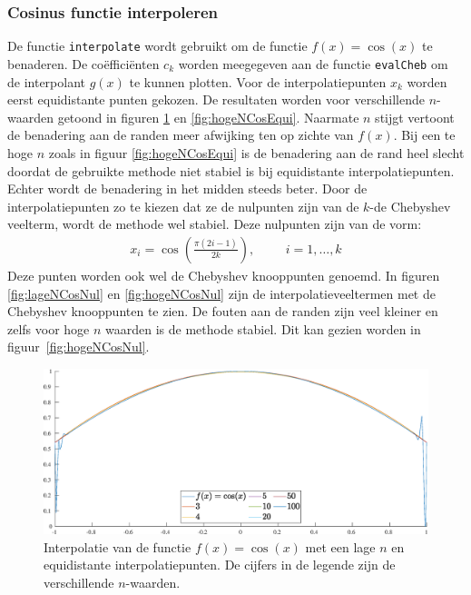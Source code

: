 \documentclass[a4paper, 12pt, titlepage, fleqn]{article}
\begin{document}
\subsubsection{Cosinus functie interpoleren}
\label{cosInterpoleren}
De functie \texttt{interpolate} wordt gebruikt om de functie $f(x) = \cos(x)$ te benaderen. De co\"effici\"enten $c_k$ worden meegegeven aan de functie \texttt{evalCheb} om de interpolant $g(x)$ te kunnen plotten. Voor de interpolatiepunten $x_k$ worden eerst equidistante punten gekozen. De resultaten worden voor verschillende $n$-waarden getoond in figuren \ref{lageNCosEqui} en \ref{fig:hogeNCosEqui}. Naarmate $n$ stijgt vertoont de benadering aan de randen meer afwijking ten op zichte van $f(x)$. Bij een te hoge $n$ zoals in figuur \ref{fig:hogeNCosEqui} is de benadering aan de rand heel slecht doordat de gebruikte methode niet stabiel is bij equidistante interpolatiepunten. Echter wordt de benadering in het midden steeds beter. Door de interpolatiepunten zo te kiezen dat ze de nulpunten zijn van de $k$-de Chebyshev veelterm, wordt de methode wel stabiel. Deze nulpunten zijn van de vorm:
\begin{align*}
x_i = \cos\left(\frac{\pi(2i-1)}{2k}\right), \hspace{1cm} i = 1,\ldots,k
\end{align*}
Deze punten worden ook wel de Chebyshev knooppunten genoemd. In figuren \ref{fig:lageNCosNul} en \ref{fig:hogeNCosNul} zijn de interpolatieveeltermen met de Chebyshev knooppunten te zien. De fouten aan de randen zijn veel kleiner en zelfs voor hoge $n$ waarden is de methode stabiel. Dit kan gezien worden in figuur~\ref{fig:hogeNCosNul}.


\begin{figure}
\centering
\includegraphics[scale=0.4]{../Afbeeldingen/cos_equi_laag.eps}
\caption[Cosinus interpolatie, weinig equidistante interpolatiepunten]{Interpolatie van de functie $f(x) = \cos(x)$ met een lage $n$ en equidistante interpolatiepunten. De cijfers in de legende zijn de verschillende $n$-waarden.}
\label{lageNCosEqui}
\end{figure}
\end{document}
